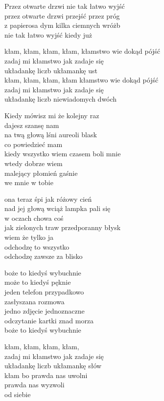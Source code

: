 \begin{text}
    Przez otwarte drzwi nie tak łatwo wyjść\\
    przez otwarte drzwi przejść przez próg\\
    z papierosa dym kilka ciemnych wróżb\\
    nie tak łatwo wyjść kiedy już

    kłam, kłam, kłam, kłam, kłamstwo wie dokąd pójść\\
    zadaj mi kłamstwo jak zadaje się\\
    układankę liczb ukłamankę ust\\
    kłam, kłam, kłam, kłam kłamstwo wie dokąd pójść\\
    zadaj mi kłamstwo jak zadaje się\\
    układankę liczb niewiadomych dwóch

    Kiedy mówisz mi że kolejny raz\\
    dajesz szansę nam\\
    na twą głową lśni aureoli blask\\
    co powiedzieć mam\\
    kiedy wszystko wiem czasem boli mnie\\
    wtedy dobrze wiem\\
    malejący płomień gaśnie\\
    we mnie w tobie

    ona teraz śpi jak różowy cień\\
    nad jej głową wciąż lampka pali się\\
    w oczach chowa coś\\
    jak zielonych traw przedporanny błysk\\
    wiem że tylko ja\\
    odchodzę to wszystko\\
    odchodzę zawsze za blisko

    boże to kiedyś wybuchnie\\
    może to kiedyś pęknie\\
    jeden telefon przypadkowo\\
    zasłyszana rozmowa\\
    jedno zdjęcie jednoznaczne\\
    odczytanie kartki znad morza\\
    boże to kiedyś wybuchnie

    kłam, kłam, kłam, kłam,\\
    zadaj mi kłamstwo jak zadaje się\\
    układankę liczb ukłamankę słów\\
    kłam bo prawda nas uwolni\\
    prawda nas wyzwoli\\
    od siebie
\end{text}
\begin{chord}

\end{chord}